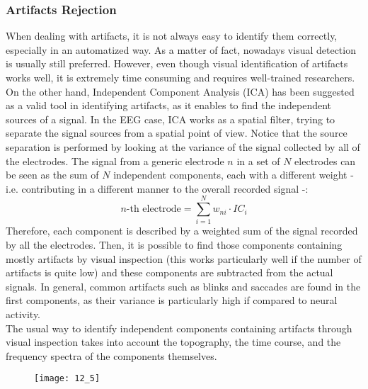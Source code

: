 \subsubsection{Artifacts Rejection}
When dealing with artifacts, it is not always easy to identify them correctly, especially in
an automatized way. As a matter of fact, nowadays visual detection is usually still preferred.
However, even though visual identification of artifacts works well, it is extremely time
consuming and requires well-trained researchers.\\
On the other hand, Independent Component Analysis (ICA) has
been suggested as a valid tool in identifying artifacts, as it enables to find the
independent sources of a signal. In the EEG case, ICA works as a spatial filter, trying to
separate the signal sources from a spatial point of view. Notice that the source separation
is performed by looking at the variance of the signal collected by all of the electrodes.
The signal from a generic electrode \(n\) in a set of \(N\) electrodes can be seen as the
sum of \(N\) independent components, each with a different weight - i.e. contributing in a
different manner to the overall recorded signal -:
\begin{equation*}
    n\text{-th electrode} = \sum_{i=1}^N w_{ni}\cdot{IC_i}
\end{equation*}
Therefore, each component is described by a weighted sum of the signal recorded by all the
electrodes. Then, it is possible to find those components containing mostly artifacts by visual
inspection (this works particularly well if the number of artifacts is quite low) and these
components are subtracted from the actual signals. In general, common artifacts such as blinks
and saccades are found in the first components, as their variance is particularly high if
compared to neural activity.\\
The usual way to identify independent components containing artifacts through visual inspection
takes into account the topography, the time course, and the frequency spectra of the
components themselves.
\begin{figure}[H]
    \centering
    \texttt{[image: 12\_5]}
\end{figure}
